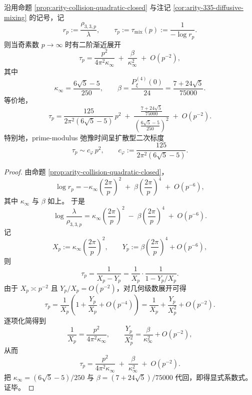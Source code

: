 \begin{conclusion}[纯碰撞单位根扭曲的素模弛豫时间二阶展开]\label{con:xi-time-part9o-prime-modulus-relaxation-second-order}
沿用命题 \ref{prop:arity-collision-quadratic-closed} 与注记 \ref{cor:arity-335-diffusive-mixing} 的记号，记
\[
r_p:=\frac{\rho_{3,3,p}}{\lambda},
\qquad
\tau_p:=\tau_{\mathrm{mix}}(p):=\frac{1}{-\log r_p}.
\]
则当奇素数 \(p\to\infty\) 时有二阶渐近展开
\[
\tau_p
=
\frac{p^2}{4\pi^2\kappa_\infty}
\;+\;
\frac{\beta}{\kappa_\infty^2}
\;+\;
O(p^{-2}),
\]
其中
\[
\kappa_\infty=\frac{6\sqrt5-5}{250},
\qquad
\beta=\frac{P_\xi^{(4)}(0)}{24}=\frac{7+24\sqrt5}{75000}.
\]
等价地，
\[
\tau_p
=
\frac{125}{2\pi^2(6\sqrt5-5)}\,p^2
\;+\;
\frac{\frac{7+24\sqrt5}{75000}}
{\left(\frac{6\sqrt5-5}{250}\right)^2}
\;+\;
O(p^{-2}).
\]
特别地，prime-modulus 弛豫时间呈扩散型二次标度
\[
\tau_p\sim c_\varphi\,p^2,
\qquad
c_\varphi:=\frac{125}{2\pi^2(6\sqrt5-5)}.
\]
\end{conclusion}
\begin{proof}
由命题 \ref{prop:arity-collision-quadratic-closed}，
\[
\log r_p
=
-\kappa_\infty\left(\frac{2\pi}{p}\right)^2
\;+\;
\beta\left(\frac{2\pi}{p}\right)^4
\;+\;
O(p^{-6}),
\]
其中 \(\kappa_\infty\) 与 \(\beta\) 如上。
于是
\[
\log\frac{\lambda}{\rho_{3,3,p}}
=
\kappa_\infty\left(\frac{2\pi}{p}\right)^2
\;-\;
\beta\left(\frac{2\pi}{p}\right)^4
\;+\;
O(p^{-6}).
\]
记
\[
X_p:=\kappa_\infty\left(\frac{2\pi}{p}\right)^2,
\qquad
Y_p:=\beta\left(\frac{2\pi}{p}\right)^4+O(p^{-6}),
\]
则
\[
\tau_p=\frac{1}{X_p-Y_p}
=
\frac{1}{X_p}\cdot \frac{1}{1-Y_p/X_p}.
\]
由于 \(X_p\asymp p^{-2}\) 且 \(Y_p/X_p=O(p^{-2})\)，对几何级数展开可得
\[
\tau_p
=
\frac{1}{X_p}\left(1+\frac{Y_p}{X_p}+O(p^{-4})\right)
=
\frac{1}{X_p}+\frac{Y_p}{X_p^2}+O(p^{-2}).
\]
逐项化简得到
\[
\frac{1}{X_p}
=
\frac{p^2}{4\pi^2\kappa_\infty},
\qquad
\frac{Y_p}{X_p^2}
=
\frac{\beta}{\kappa_\infty^2}+O(p^{-2}),
\]
从而
\[
\tau_p
=
\frac{p^2}{4\pi^2\kappa_\infty}
\;+\;
\frac{\beta}{\kappa_\infty^2}
\;+\;
O(p^{-2}).
\]
把 \(\kappa_\infty=(6\sqrt5-5)/250\) 与 \(\beta=(7+24\sqrt5)/75000\) 代回，即得显式系数式。证毕。
\end{proof}

